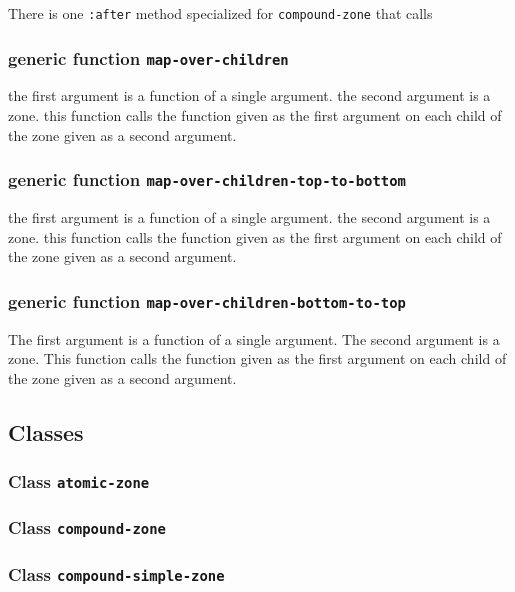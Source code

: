 \documentclass{report}
\begin{document}
There is one \texttt{:after} method specialized for
\texttt{compound-zone} that calls

\subsubsection{generic function \texttt{map-over-children}}

the first argument is a function of a single argument.  the second
argument is a zone.  this function calls the function given as the
first argument on each child of the zone given as a second argument.  

\subsubsection{generic function \texttt{map-over-children-top-to-bottom}}

the first argument is a function of a single argument.  the second
argument is a zone.  this function calls the function given as the
first argument on each child of the zone given as a second argument.  

\subsubsection{generic function \texttt{map-over-children-bottom-to-top}}

The first argument is a function of a single argument.  The second
argument is a zone.  This function calls the function given as the
first argument on each child of the zone given as a second argument.  

\subsection{Classes}

\subsubsection{Class \texttt{atomic-zone}}

\subsubsection{Class \texttt{compound-zone}}

\subsubsection{Class \texttt{compound-simple-zone}}
\end{document}
